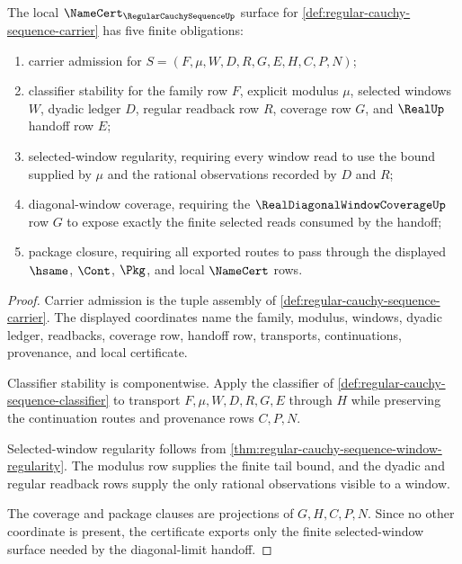 \begin{theorem}
\label{thm:regular-cauchy-sequence-namecert-obligations}
The local $\NameCert_{\RegularCauchySequenceUp}$ surface for \autoref{def:regular-cauchy-sequence-carrier} has five finite obligations:
\begin{enumerate}
\item carrier admission for $S=(F,\mu,W,D,R,G,E,H,C,P,N)$;
\item classifier stability for the family row $F$, explicit modulus $\mu$, selected windows $W$, dyadic ledger $D$, regular readback row $R$, coverage row $G$, and $\RealUp$ handoff row $E$;
\item selected-window regularity, requiring every window read to use the bound supplied by $\mu$ and the rational observations recorded by $D$ and $R$;
\item diagonal-window coverage, requiring the $\RealDiagonalWindowCoverageUp$ row $G$ to expose exactly the finite selected reads consumed by the handoff;
\item package closure, requiring all exported routes to pass through the displayed $\hsame$, $\Cont$, $\Pkg$, and local $\NameCert$ rows.
\end{enumerate}
\end{theorem}
\begin{proof}
Carrier admission is the tuple assembly of \autoref{def:regular-cauchy-sequence-carrier}. The displayed coordinates name the family, modulus, windows, dyadic ledger, readbacks, coverage row, handoff row, transports, continuations, provenance, and local certificate.

Classifier stability is componentwise. Apply the classifier of \autoref{def:regular-cauchy-sequence-classifier} to transport $F,\mu,W,D,R,G,E$ through $H$ while preserving the continuation routes and provenance rows $C,P,N$.

Selected-window regularity follows from \autoref{thm:regular-cauchy-sequence-window-regularity}. The modulus row supplies the finite tail bound, and the dyadic and regular readback rows supply the only rational observations visible to a window.

The coverage and package clauses are projections of $G,H,C,P,N$. Since no other coordinate is present, the certificate exports only the finite selected-window surface needed by the diagonal-limit handoff.
\end{proof}

